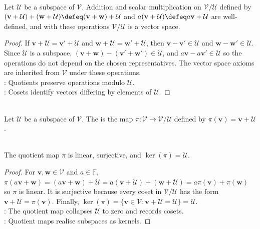 \begin{proposition} \label{prop:quotient-space-structure} \\
Let $\mathcal{U}$ be a subspace of $\mathcal{V}$. Addition and scalar multiplication on $\mathcal{V}/\mathcal{U}$ defined by $(\mathbf{v} + \mathcal{U}) + (\mathbf{w} + \mathcal{U}) \defeq (\mathbf{v} + \mathbf{w}) + \mathcal{U}$ and $a(\mathbf{v} + \mathcal{U}) \defeq a\mathbf{v} + \mathcal{U}$ are well-defined, and with these operations $\mathcal{V}/\mathcal{U}$ is a vector space.
\begin{proof}
If $\mathbf{v} + \mathcal{U} = \mathbf{v}' + \mathcal{U}$ and $\mathbf{w} + \mathcal{U} = \mathbf{w}' + \mathcal{U}$, then $\mathbf{v}-\mathbf{v}' \in \mathcal{U}$ and $\mathbf{w}-\mathbf{w}' \in \mathcal{U}$.\\
Since $\mathcal{U}$ is a subspace, $(\mathbf{v}+\mathbf{w}) - (\mathbf{v}'+\mathbf{w}') \in \mathcal{U}$, and $a\mathbf{v} - a\mathbf{v}' \in \mathcal{U}$ so the operations do not depend on the chosen representatives. The vector space axioms are inherited from $\mathcal{V}$ under these operations.\\
: Quotients preserve operations modulo $\mathcal{U}$.\\
: Cosets identify vectors differing by elements of $\mathcal{U}$.
\end{proof}
\end{proposition}

\begin{definition} \\
Let $\mathcal{U}$ be a subspace of $\mathcal{V}$. The  is the map $\pi : \mathcal{V} \to \mathcal{V}/\mathcal{U}$ defined by $\pi(\mathbf{v})=\mathbf{v}+\mathcal{U}$.
\end{definition}

\begin{proposition} \label{prop:quotient-map-properties} \\
The quotient map $\pi$ is linear, surjective, and $\ker(\pi) = \mathcal{U}$.
\begin{proof}
For $\mathbf{v},\mathbf{w}\in\mathcal{V}$ and $a\in\mathbb{F}$, $\pi(a\mathbf{v}+\mathbf{w})=(a\mathbf{v}+\mathbf{w})+\mathcal{U} =a(\mathbf{v}+\mathcal{U})+(\mathbf{w}+\mathcal{U}) =a\pi(\mathbf{v})+\pi(\mathbf{w})$ so $\pi$ is linear. It is surjective because every coset in $\mathcal{V}/\mathcal{U}$ has the form $\mathbf{v}+\mathcal{U}=\pi(\mathbf{v})$. Finally, $\ker(\pi)=\{\mathbf{v}\in\mathcal{V}:\mathbf{v}+\mathcal{U}=\mathcal{U}\}=\mathcal{U}$.\\
: The quotient map collapses $\mathcal{U}$ to zero and records cosets.\\
: Quotient maps realise subspaces as kernels.
\end{proof}
\end{proposition}

